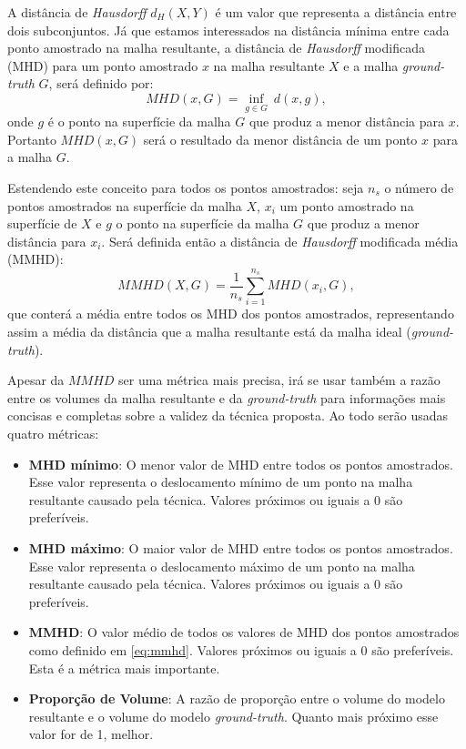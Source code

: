 A distância de \textit{Hausdorff} $d_H(X,Y)$ é um valor que representa a distância entre dois subconjuntos. Já que estamos interessados na distância mínima entre cada ponto amostrado na malha resultante, a distância de \textit{Hausdorff} modificada (MHD) para um ponto amostrado $x$ na malha resultante $X$ e a malha \textit{ground-truth} $G$, será definido por:
\begin{equation}
	MHD(x,G) = \underset{g \in G}{\inf} \: d(x,g),
\end{equation}
onde $g$ é o ponto na superfície da malha $G$ que produz a menor distância para $x$. Portanto $MHD(x,G)$ será o resultado da menor distância de um ponto $x$ para a malha $G$. 

Estendendo este conceito para todos os pontos amostrados: seja $n_s$ o número de pontos amostrados na superfície da malha $X$, $x_i$ um ponto amostrado na superfície de $X$ e $g$ o ponto na superfície da malha $G$ que produz a menor distância para $x_i$. Será definida então a distância de \textit{Hausdorff} modificada média (MMHD):
\begin{equation} \label{eq:mmhd}
	MMHD(X,G) = \frac{1}{n_s} \sum_{i=1}^{n_s}{MHD(x_i,G)},
\end{equation}
que conterá a média entre todos os MHD dos pontos amostrados, representando assim a média da distância que a malha resultante está da malha ideal (\textit{ground-truth}).

Apesar da $MMHD$ ser uma métrica mais precisa, irá se usar também a razão entre os volumes da malha resultante e da \textit{ground-truth} para informações mais concisas e completas sobre a validez da técnica proposta. Ao todo serão usadas quatro métricas:

\begin{itemize} 
    \item \textbf{MHD mínimo}: O menor valor de MHD entre todos os pontos amostrados. Esse valor representa o deslocamento mínimo de um ponto na malha resultante causado pela técnica. Valores próximos ou iguais a 0 são preferíveis.
    \item \textbf{MHD máximo}: O maior valor de MHD entre todos os pontos amostrados. Esse valor representa o deslocamento máximo de um ponto na malha resultante causado pela técnica. Valores próximos ou iguais a 0 são preferíveis.
    \item \textbf{MMHD}: O valor médio de todos os valores de MHD dos pontos amostrados como definido em \ref{eq:mmhd}. Valores próximos ou iguais a 0 são preferíveis. Esta é a métrica mais importante.
    \item \textbf{Proporção de Volume}: A razão de proporção entre o volume do modelo resultante e o volume do modelo \textit{ground-truth}. Quanto mais próximo esse valor for de 1, melhor.
\end{itemize}


